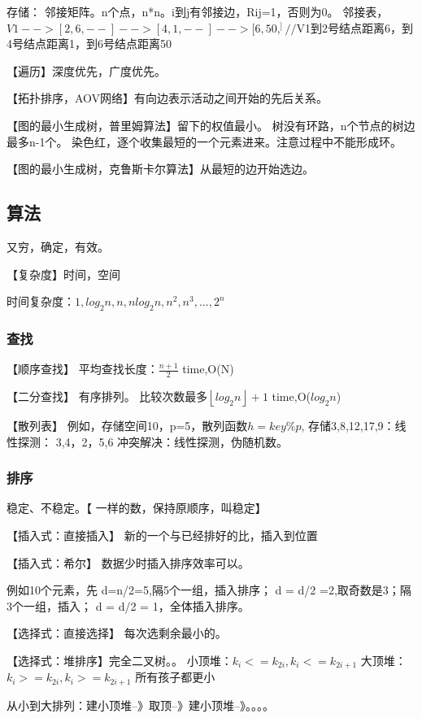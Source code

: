 \documentclass[UTF8]{article}
\begin{document}
存储：
邻接矩阵。n个点，n*n。i到j有邻接边，Rij=1，否则为0。
邻接表，$V1-->[2,6,--]-->[4,1,--]-->[6,50,^]//$V1到2号结点距离6，到4号结点距离1，到6号结点距离50

【遍历】深度优先，广度优先。

【拓扑排序，AOV网络】有向边表示活动之间开始的先后关系。

【图的最小生成树，普里姆算法】留下的权值最小。
树没有环路，n个节点的树边最多n-1个。
染色红，逐个收集最短的一个元素进来。注意过程中不能形成环。

【图的最小生成树，克鲁斯卡尔算法】从最短的边开始选边。


\subsection{算法}
又穷，确定，有效。

【复杂度】时间，空间

时间复杂度：$1,log_2n,n,nlog_2n,n^2,n^3,...,2^n$

\subsubsection{查找}

【顺序查找】
平均查找长度：$\frac{n+1}{2}$
time,O(N)

【二分查找】
有序排列。
比较次数最多$\left\lfloor log_2n\right\rfloor +1$
time,O($log_2n$)

【散列表】
例如，存储空间10，p=5，散列函数$h=key\%p$,
存储3,8,12,17,9：线性探测： 3,4，2，5,6
冲突解决：线性探测，伪随机数。

\subsubsection{排序}

稳定、不稳定。【 一样的数，保持原顺序，叫稳定】

【插入式：直接插入】
新的一个与已经排好的比，插入到位置

【插入式：希尔】
数据少时插入排序效率可以。

例如10个元素，先
d=n/2=5,隔5个一组，插入排序；
d = d/2  =2,取奇数是3；隔3个一组，插入；
d = d/2 = 1，全体插入排序。


【选择式：直接选择】
每次选剩余最小的。

【选择式：堆排序】完全二叉树。。
小顶堆：$k_i<=k_{2i}, k_i<=k_{2i+1}$
大顶堆：$k_i>=k_{2i}, k_i>=k_{2i+1}$ 所有孩子都更小

从小到大排列：建小顶堆--》取顶--》建小顶堆--》。。。。
\end{document}
